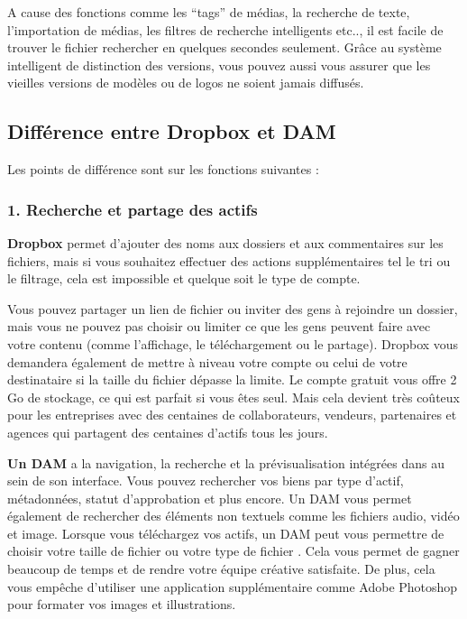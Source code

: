 A cause des fonctions comme les “tags” de médias, la recherche de texte, l’importation de médias, les filtres de recherche intelligents etc.., il est facile de trouver le fichier rechercher en quelques secondes seulement. Grâce au système intelligent de distinction des versions, vous pouvez aussi vous assurer que les vieilles versions de modèles ou de logos ne soient jamais diffusés. 

\newpage
\subsection{Différence entre Dropbox et DAM }{}
Les points de différence sont sur les fonctions suivantes :

\subsubsection {1. Recherche et partage des actifs 
}{}


\textbf{Dropbox} permet d'ajouter des noms aux dossiers et aux commentaires sur les fichiers, mais si vous souhaitez effectuer des actions supplémentaires tel le tri ou le filtrage, cela est impossible et quelque soit le type de compte. 

Vous pouvez partager un lien de fichier ou inviter des gens à rejoindre un dossier, mais vous ne pouvez pas choisir ou limiter ce que les gens peuvent faire avec votre contenu (comme l'affichage, le téléchargement ou le partage). Dropbox vous demandera également de mettre à niveau votre compte ou celui de votre destinataire si la taille du fichier dépasse la limite. Le compte gratuit vous offre 2 Go de stockage, ce qui est parfait si vous êtes seul. Mais cela devient très coûteux pour les entreprises avec des centaines de collaborateurs, vendeurs, partenaires et agences qui partagent des centaines d'actifs tous les jours.
\newline


\textbf{Un DAM} a la navigation, la recherche et la prévisualisation intégrées dans au sein de son interface. Vous pouvez rechercher vos biens par type d'actif, métadonnées, statut d'approbation et plus encore. Un DAM vous permet également de rechercher des éléments non textuels comme les fichiers audio, vidéo et image. Lorsque vous téléchargez vos actifs, un DAM peut vous permettre de choisir votre taille de fichier ou votre type de fichier . Cela vous permet de gagner beaucoup de temps et de rendre votre équipe créative satisfaite. De plus, cela vous empêche d'utiliser une application supplémentaire comme Adobe Photoshop pour formater vos images et illustrations.


